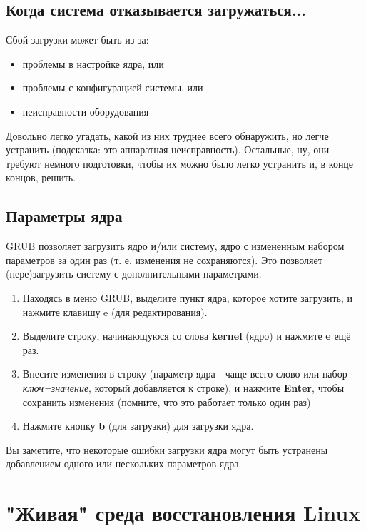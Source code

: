 \documentclass[10pt]{book}
\begin{document}
\subsection{Когда система отказывается загружаться...}

Сбой загрузки может быть из-за:

\begin{itemize}
\item проблемы в настройке ядра, или
\item проблемы с конфигурацией системы, или
\item неисправности оборудования
\end{itemize}

Довольно легко угадать, какой из них труднее всего обнаружить, но легче устранить (подсказка: это аппаратная неисправность). Остальные, ну, они требуют немного подготовки, чтобы их можно было легко устранить и, в конце концов, решить.

\subsection{Параметры ядра}

GRUB позволяет загрузить ядро и/или систему, ядро с измененным набором параметров за один раз (т. е. изменения не сохраняются). Это позволяет (пере)загрузить систему с дополнительными параметрами.

\begin{enumerate}
\item Находясь в меню GRUB, выделите пункт ядра, которое хотите загрузить, и нажмите клавишу \textbf{}e (для редактирования).
\item Выделите строку, начинающуюся со слова \textbf{kernel} (ядро) и нажмите \textbf{e}  ещё раз.
\item Внесите изменения в строку (параметр ядра - чаще всего слово или набор \textit{ключ=значение}, который добавляется к строке),
и нажмите \textbf{Enter}, чтобы сохранить изменения (помните, что это работает только один раз)
\item Нажмите кнопку \textbf{b} (для загрузки) для загрузки ядра.
\end{enumerate}

Вы заметите, что некоторые ошибки загрузки ядра могут быть устранены добавлением одного или нескольких параметров ядра.

\section{"Живая" среда восстановления Linux}
\end{document}
